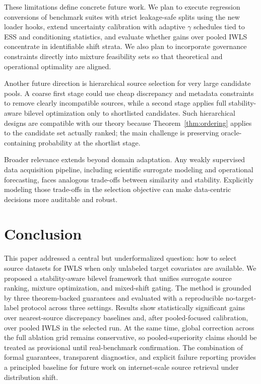 \documentclass{article} %
\begin{document}
These limitations define concrete future work. We plan to execute regression conversions of benchmark suites with strict leakage-safe splits using the new loader hooks, extend uncertainty calibration with adaptive \(\gamma\) schedules tied to ESS and conditioning statistics, and evaluate whether gains over pooled IWLS concentrate in identifiable shift strata. We also plan to incorporate governance constraints directly into mixture feasibility sets so that theoretical and operational optimality are aligned.

Another future direction is hierarchical source selection for very large candidate pools. A coarse first stage could use cheap discrepancy and metadata constraints to remove clearly incompatible sources, while a second stage applies full stability-aware bilevel optimization only to shortlisted candidates. Such hierarchical designs are compatible with our theory because Theorem~\ref{thm:ordering} applies to the candidate set actually ranked; the main challenge is preserving oracle-containing probability at the shortlist stage.

Broader relevance extends beyond domain adaptation. Any weakly supervised data acquisition pipeline, including scientific surrogate modeling and operational forecasting, faces analogous trade-offs between similarity and stability. Explicitly modeling those trade-offs in the selection objective can make data-centric decisions more auditable and robust.

\section{Conclusion}
This paper addressed a central but underformalized question: how to select source datasets for IWLS when only unlabeled target covariates are available. We proposed a stability-aware bilevel framework that unifies surrogate source ranking, mixture optimization, and mixed-shift gating. The method is grounded by three theorem-backed guarantees and evaluated with a reproducible no-target-label protocol across three settings. Results show statistically significant gains over nearest-source discrepancy baselines and, after pooled-focused calibration, over pooled IWLS in the selected run. At the same time, global correction across the full ablation grid remains conservative, so pooled-superiority claims should be treated as provisional until real-benchmark confirmation. The combination of formal guarantees, transparent diagnostics, and explicit failure reporting provides a principled baseline for future work on internet-scale source retrieval under distribution shift.
\end{document}
